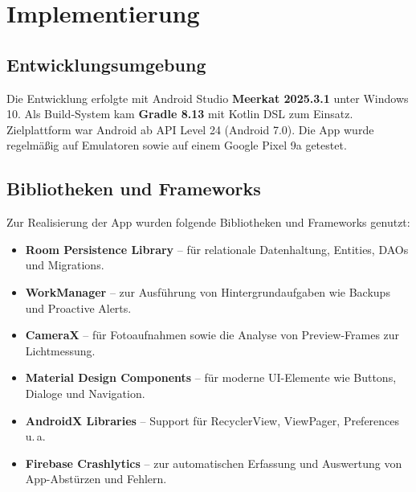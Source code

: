 \documentclass[14pt,a4paper]{report}
\begin{document}
\chapter{Implementierung}

\section{Entwicklungsumgebung}
Die Entwicklung erfolgte mit Android Studio \textbf{Meerkat 2025.3.1} unter Windows 10. 
Als Build-System kam \textbf{Gradle 8.13} mit Kotlin DSL zum Einsatz. 
Zielplattform war Android ab API Level 24 (Android 7.0). 
Die App wurde regelmäßig auf Emulatoren sowie auf einem Google Pixel 9a getestet.

\section{Bibliotheken und Frameworks}
Zur Realisierung der App wurden folgende Bibliotheken und Frameworks genutzt:
\begin{itemize}
    \item \textbf{Room Persistence Library} – für relationale Datenhaltung, Entities, DAOs und Migrations.
    \item \textbf{WorkManager} – zur Ausführung von Hintergrundaufgaben wie Backups und Proactive Alerts.
    \item \textbf{CameraX} – für Fotoaufnahmen sowie die Analyse von Preview-Frames zur Lichtmessung.
    \item \textbf{Material Design Components} – für moderne UI-Elemente wie Buttons, Dialoge und Navigation.
    \item \textbf{AndroidX Libraries} – Support für RecyclerView, ViewPager, Preferences u.\,a.
    \item \textbf{Firebase Crashlytics} – zur automatischen Erfassung und Auswertung von App-Abstürzen und Fehlern.
\end{itemize}
\end{document}
